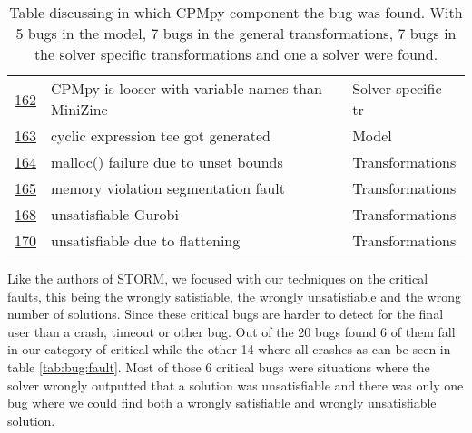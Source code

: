\begin{table}[]
\begin{tabular}{lll}
		\href{https://github.com/CPMpy/cpmpy/issues/162}{162} & CPMpy is looser with variable names than MiniZinc & Solver specific tr \\
		\href{https://github.com/CPMpy/cpmpy/issues/163}{163} & cyclic expression tee got generated               & Model              \\
		\href{https://github.com/CPMpy/cpmpy/issues/164}{164} & malloc() failure due to unset bounds              & Transformations     \\
		\href{https://github.com/CPMpy/cpmpy/issues/165}{165} & memory violation segmentation fault               & Transformations     \\
		\href{https://github.com/CPMpy/cpmpy/issues/168}{168} & unsatisfiable Gurobi                              & Transformations     \\
		\href{https://github.com/CPMpy/cpmpy/issues/170}{170} & unsatisfiable due to flattening                   & Transformations     \\ \bottomrule        
	\end{tabular}
	\caption{Table discussing in which CPMpy component the bug was found. With 5 bugs in the model, 7 bugs in the general transformations, 7 bugs in the solver specific transformations and one a solver were found.}
	\label{tab:bug:placeComponent}
\end{table}

Like the authors of STORM, we focused with our techniques on the critical faults, this being the wrongly satisfiable, the wrongly unsatisfiable and the wrong number of solutions. Since these critical bugs are harder to detect for the final user than a crash, timeout or other bug. Out of the 20 bugs found 6 of them fall in our category of critical while the other 14 where all crashes as can be seen in table \ref{tab:bug:fault}. Most of those 6 critical bugs were situations where the solver wrongly outputted that a solution was unsatisfiable and there was only one bug where we could find both a wrongly satisfiable and wrongly unsatisfiable solution.

